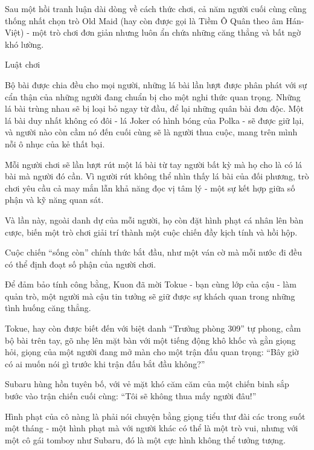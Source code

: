 \documentclass[../main.tex]{subfiles}
\begin{document}
Sau một hồi tranh luận dài dòng về cách thức chơi, cả năm người cuối cùng cũng thống nhất chọn trò Old Maid (hay còn được gọi là Tiềm Ô Quân theo âm Hán-Việt) - một trò chơi đơn giản nhưng luôn ẩn chứa những căng thẳng và bất ngờ khó lường.

\il

\begin{center}
  {\abv Luật chơi}
\end{center}

Bộ bài được chia đều cho mọi người, những lá bài lần lượt được phân phát với sự cẩn thận của những người đang chuẩn bị cho một nghi thức quan trọng. Những lá bài trùng nhau sẽ bị loại bỏ ngay từ đầu, để lại những quân bài đơn độc. Một lá bài duy nhất không có đôi - lá Joker có hình bóng của Polka - sẽ được giữ lại, và người nào còn cầm nó đến cuối cùng sẽ là người thua cuộc, mang trên mình nỗi ô nhục của kẻ thất bại.

Mỗi người chơi sẽ lần lượt rút một lá bài từ tay người bất kỳ mà họ cho là có lá bài mà người đó cần. Vì người rút không thể nhìn thấy lá bài của đối phương, trò chơi yêu cầu cả may mắn lẫn khả năng đọc vị tâm lý - một sự kết hợp giữa số phận và kỹ năng quan sát.

Và lần này, ngoài danh dự của mỗi người, họ còn đặt hình phạt cá nhân lên bàn cược, biến một trò chơi giải trí thành một cuộc chiến đầy kịch tính và hồi hộp.

\il

Cuộc chiến ``sống còn'' chính thức bắt đầu, như một ván cờ mà mỗi nước đi đều có thể định đoạt số phận của người chơi.

Để đảm bảo tính công bằng, Kuon đã mời Tokue - bạn cùng lớp của cậu - làm quản trò, một người mà cậu tin tưởng sẽ giữ được sự khách quan trong những tình huống căng thẳng.

Tokue, hay còn được biết đến với biệt danh ``Trưởng phòng 309'' tự phong, cầm bộ bài trên tay, gõ nhẹ lên mặt bàn với một tiếng động khô khốc và gằn giọng hỏi, giọng của một người đang mở màn cho một trận đấu quan trọng: ``Bây giờ có ai muốn nói gì trước khi trận đấu bắt đầu không?''

\il

Subaru hùng hồn tuyên bố, với vẻ mặt khó căm căm của một chiến binh sắp bước vào trận chiến cuối cùng: ``Tôi sẽ không thua mấy người đâu!''

Hình phạt của cô nàng là phải nói chuyện bằng giọng tiểu thư đài các trong suốt một tháng - một hình phạt mà với người khác có thể là một trò vui, nhưng với một cô gái tomboy như Subaru, đó là một cực hình không thể tưởng tượng.
\end{document}
